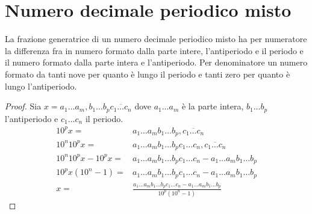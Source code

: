 \section{Numero decimale periodico misto}
\begin{thm}
La frazione generatrice di un numero decimale periodico misto ha per numeratore la differenza fra in numero formato dalla parte intere, l'antiperiodo e il periodo e il numero formato dalla parte intera e l'antiperiodo. Per denominatore un numero formato da tanti nove per quanto è lungo il periodo e tanti zero per quanto è lungo l'antiperiodo.  
\end{thm}
\begin{proof}
	Sia $x=a_1\dots a_m,b_1\dots b_p \overline{c_1\dots c_n}$ dove $a_1\dots a_m$ è la parte intera, $b_1\dots b_p$ l'antiperiodo e $c_1\dots c_n$ il periodo. 
	\begin{align*}
	10^px=&a_1\dots a_m b_1\dots b_p,\overline{c_1\dots c_n}\\
	10^n10^px=&a_1\dots a_m b_1\dots b_p c_1\dots c_n,\overline{c_1\dots c_n}\\
	10^n10^px-10^px=&a_1\dots a_m b_1\dots b_p c_1\dots c_n-a_1\dots a_m b_1\dots b_p\\
	10^px(10^n-1)=&a_1\dots a_m b_1\dots b_p c_1\dots c_n-a_1\dots a_m b_1\dots b_p\\
	x=&\frac{a_1\dots a_m b_1\dots b_p c_1\dots c_n-a_1\dots a_m b_1\dots b_p}{10^p(10^n-1)}
	\end{align*}
\end{proof}